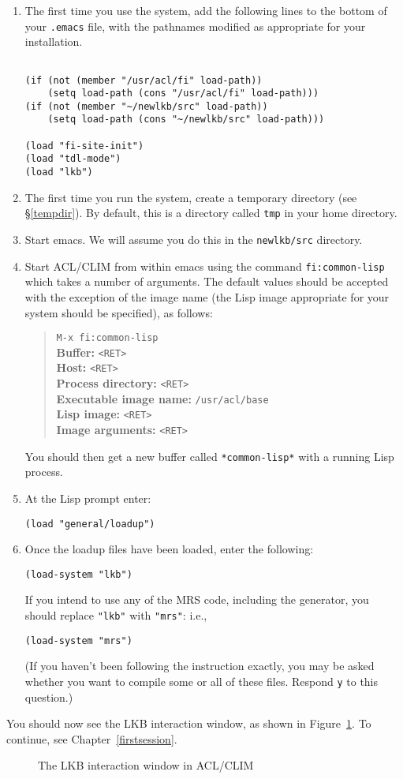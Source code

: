 \documentclass[12pt]{report}
\newcommand{\filename}[1]{{\tt #1}}
\begin{document}
\begin{enumerate}
\item The first time you use the system,
add the following lines to the bottom of your \filename{.emacs}
file, with the pathnames modified as appropriate for your
installation.
\begin{verbatim}

(if (not (member "/usr/acl/fi" load-path))
    (setq load-path (cons "/usr/acl/fi" load-path)))
(if (not (member "~/newlkb/src" load-path))
    (setq load-path (cons "~/newlkb/src" load-path)))
	
(load "fi-site-init")
(load "tdl-mode")
(load "lkb")
\end{verbatim}
\item The first time you run the system,
create a temporary directory (see \S\ref{tempdir}).  By default, this is
a directory called \filename{tmp} in your home directory.
\item Start emacs.  We will assume you
do this in the \filename{newlkb/src} directory.
\item Start ACL/CLIM from within emacs using the 
command \verb+fi:common-lisp+ which takes a number
of arguments. The
default values should be accepted with the exception
of the image name (the Lisp image appropriate for your
system should be specified), as follows:
\begin{quote}
\verb+M-x fi:common-lisp+\\
{\bf Buffer:} \verb+<RET>+\\
{\bf Host:} \verb+<RET>+\\
{\bf Process directory:} \verb+<RET>+\\
{\bf Executable image name:} \verb+/usr/acl/base+\\
{\bf Lisp image:}  \verb+<RET>+\\
{\bf Image arguments:}  \verb+<RET>+
\end{quote}
You should then get a new buffer called \verb+*common-lisp*+ with
a running Lisp process.  
\item At the Lisp prompt enter:
\begin{verbatim}
(load "general/loadup") 
\end{verbatim}
\item Once the loadup files have been loaded, enter the following:
\begin{verbatim}
(load-system "lkb")
\end{verbatim}
If you intend to use any of the MRS code, including the generator,
you should replace \verb+"lkb"+ with \verb+"mrs"+: i.e.,
\begin{verbatim}
(load-system "mrs")
\end{verbatim}
(If you haven't been following the instruction exactly, you may be asked whether
you want to compile some or all of these files.  Respond {\tt y} to this
question.)
\end{enumerate}
You
should now see the LKB interaction window, as shown in 
Figure~\ref{lkbtop-unix}.
To continue, see Chapter~\ref{firstsession}.
\begin{figure}
\caption{The LKB interaction window in ACL/CLIM}
\label{lkbtop-unix}
\end{figure}
\end{document}
